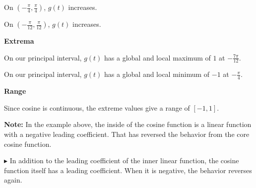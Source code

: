 \documentclass{ximera}
\begin{document}
\begin{example}
On $\left( -\frac{\pi}{4}, \frac{\pi}{4} \right)$, $g(t)$ increases.

On $\left( -\frac{\pi}{12}, \frac{\pi}{12} \right)$, $g(t)$ increases.








\textbf{\textcolor{blue!55!black}{Extrema}} 


On our principal interval, $g(t)$ has a global and local maximum of $1$ at $-\frac{7\pi}{12}$.


On our principal interval, $g(t)$ has a global and local minimum of $-1$ at $-\frac{\pi}{4}$.



\textbf{\textcolor{blue!55!black}{Range}} 


Since cosine is continuous, the extreme values give a range of $[-1,1]$.





\end{example}

















\textbf{Note:}  In the example above, the inside of the cosine function is a linear function with a negative leading coefficient.  That has reversed the behavior from the core cosine function.





\textbf{\textcolor{blue!55!black}{$\blacktriangleright$}} In addition to the leading coefficient of the inner linear function, the cosine function itself has a leading coefficient.  When it is negative, the behavior reverses again.
\end{document}
